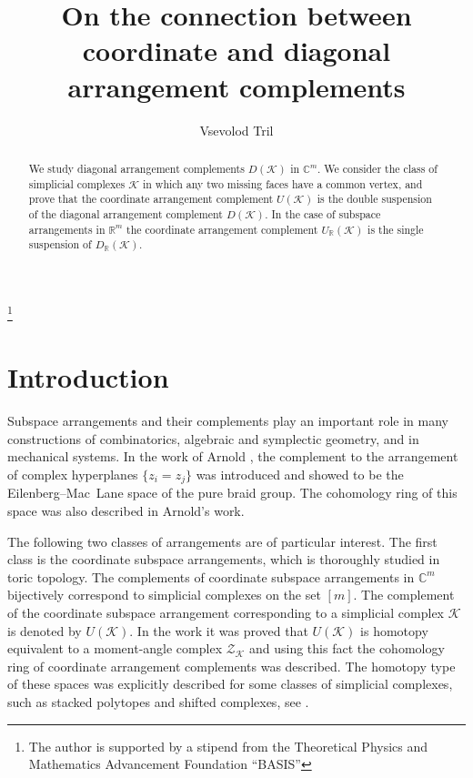 \documentclass[a4paper,12pt]{amsart}
\newcommand{\K}{\mathcal K}
\newcommand{\RR}{\mathbb R}
\newcommand{\CC}{\mathbb C}
\newcommand{\Z}{\mathcal Z}
\theoremstyle{definition}
\theoremstyle{remark}
\numberwithin{equation}{section}
\begin{document}
\title[Connection between coordinate and diagonal arrangments]{On the connection between coordinate and diagonal arrangement complements}
\author{Vsevolod Tril}
\thanks{The author is supported by a stipend from the Theoretical Physics and Mathematics Advancement Foundation ``BASIS''}
\address{Department of Mathematics and Mechanics, Moscow State University, Russia}


\begin{abstract}
	We study diagonal arrangement complements $D(\K)$ in $\CC^m$. We consider the class of simplicial complexes $\K$ in which any two missing faces
	have a common vertex, and prove that the coordinate arrangement complement $U(\K)$ is the double suspension of the diagonal arrangement complement $D(\K)$.
	In the case of subspace arrangements in $\RR^m$ the coordinate arrangement complement $U_{\RR}(\K)$ is the single suspension of $D_{\RR}(\K)$.
\end{abstract}
\maketitle
\section{Introduction}
Subspace arrangements and their complements play an important role in many constructions of combinatorics, 
algebraic and symplectic geometry, and in mechanical systems.
In the work of Arnold \cite{Arn69}, the complement to the arrangement of complex hyperplanes $\{ z_i = z_j \}$ was introduced 
and showed to be the Eilenberg--Mac~Lane space of the pure braid group. 
The cohomology ring of this space was also described in Arnold's work.

The following two classes of arrangements are of particular interest. 
The first class is the coordinate subspace arrangements, which is thoroughly studied in toric topology. 
The complements of coordinate subspace arrangements in $\CC^m$ bijectively correspond to simplicial complexes on the set $[m]$. 
The complement of the coordinate subspace arrangement corresponding to a simplicial complex $\K$ is denoted by $U(\K)$.
In the work \cite{BP00} it was proved that $U(\K)$ is homotopy equivalent to a moment-angle complex $\Z_\K$ 
and using this fact the cohomology ring of coordinate arrangement complements was described. 
The homotopy type of these spaces was explicitly described for some classes of simplicial complexes, 
such as stacked polytopes and shifted complexes, see \cite[\S~4.7 and Chapter~8]{BP}.
\end{document}
